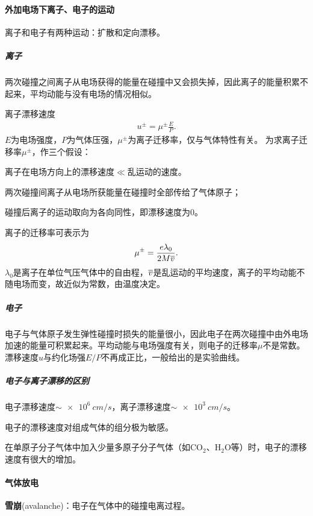\paragraph{外加电场下离子、电子的运动}
离子和电子有两种运动：扩散和定向漂移。

\subparagraph{离子}
两次碰撞之间离子从电场获得的能量在碰撞中又会损失掉，因此离子的能量积累不起来，平均动能与没有电场的情况相似。

离子漂移速度
\begin{align}
	u^\pm=\mu^\pm\frac EP.
\end{align}
$E$为电场强度，$P$为气体压强，$\mu^\pm$为离子迁移率，仅与气体特性有关。
为求离子迁移率$\mu^\pm$，作三个假设：
\begin{compactenum}
	\item 离子在电场方向上的漂移速度$\ll$乱运动的速度。
	\item 两次碰撞间离子从电场所获能量在碰撞时全部传给了气体原子；
	\item 碰撞后离子的运动取向为各向同性，即漂移速度为0。
\end{compactenum}
离子的迁移率可表示为
\[
	\mu^\pm=\frac{e\lambda_0}{2M\overline{v}}.
\]
$\lambda_0$是离子在单位气压气体中的自由程，$\overline{v}$是乱运动的平均速度，离子的平均动能不随电场而变，故近似为常数，由温度决定。

\subparagraph{电子}电子与气体原子发生弹性碰撞时损失的能量很小，因此电子在两次碰撞中由外电场加速的能量可积累起来。平均动能与电场强度有关，则电子的迁移率$\mu$不是常数。漂移速度$u$与约化场强$E/P$不再成正比，一般给出的是实验曲线。

\subparagraph{电子与离子漂移的区别}
\begin{compactenum}
	\item 电子漂移速度$\sim\SI{e6}{cm/s}$，离子漂移速度$\sim\SI{e3}{cm/s}$。
	\item 电子的漂移速度对组成气体的组分极为敏感。
	
	在单原子分子气体中加入少量多原子分子气体（如CO$_2$、H$_2$O等）时，电子的漂移速度有很大的增加。
\end{compactenum}
\paragraph{气体放电}
\textbf{雪崩}(avalanche)：电子在气体中的碰撞电离过程。

